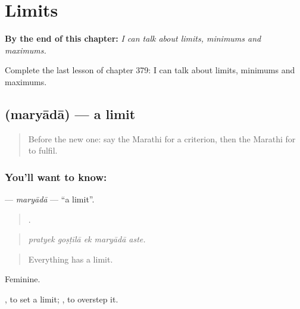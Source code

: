 
\chapter{Limits}
\label{ch:mr-limits}

\begin{chapteropening}
\textbf{By the end of this chapter:} \emph{I can talk about limits, minimums and maximums.}

Complete the last lesson of chapter 379: I can talk about limits, minimums and maximums.
\end{chapteropening}

\section[\texorpdfstring{\mr{मर्यादा} (maryādā)}{मर्यादा (maryādā)}]{ (maryādā) — a limit}

\label{lesson:MR-C379-maryada}



\begin{quote}
Before the new one: say the Marathi for a criterion, then the Marathi for to fulfil.
\end{quote}

\subsection*{You'll want to know: }
\textbf{} — \emph{maryādā} — \textquotedblleft{}a limit\textquotedblright{}.

\begin{quote}
    .
\end{quote}

\begin{quote}
\emph{pratyek goṣṭīlā ek maryādā aste.}
\end{quote}

\begin{quote}
Everything has a limit.
\end{quote}

Feminine.

 , to set a limit;  , to overstep it.

